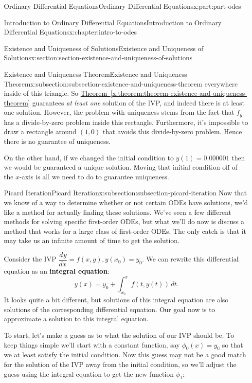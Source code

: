 \documentclass[oneside,10pt,]{book}
\newcommand{\xreffont}{\relax}
\newcommand{\terminology}[1]{\textbf{#1}}
\numberwithin{equation}{part}
\newcommand{\dv}[3][]{\dfrac{d^{#1} #2}{d #3^{#1}}}
\begin{document}
\begin{partptx}{Ordinary Differential Equations}{}{Ordinary Differential Equations}{}{}{x:part:part-odes}
\begin{chapterptx}{Introduction to Ordinary Differential Equations}{}{Introduction to Ordinary Differential Equations}{}{}{x:chapter:intro-to-odes}
\begin{sectionptx}{Existence and Uniqueness of Solutions}{}{Existence and Uniqueness of Solutions}{}{}{x:section:section-existence-and-uniqueness-of-solutions}
\begin{subsectionptx}{Existence and Uniqueness Theorem}{}{Existence and Uniqueness Theorem}{}{}{x:subsection:subsection-existence-and-uniqueness-theorem}
everywhere inside of this triangle. So \hyperref[x:theorem:theorem-existence-and-uniqueness-theorem]{Theorem~{\xreffont\ref{x:theorem:theorem-existence-and-uniqueness-theorem}}} guarantees \emph{at least one} solution of the IVP, and indeed there is at least one solution. However, the problem with uniqueness stems from the fact that \(f_{y}\) has a divide-by-zero problem inside this rectangle. Furthermore, it's impossible to draw a rectangle around \((1,0)\) that avoids this divide-by-zero problem. Hence there is no guarantee of uniqueness.%
\par
On the other hand, if we changed the initial condition to \(y(1) = 0.000001\) then we would be guaranteed a unique solution. Moving that initial condition off of the \(x\)-axis is all we need to do to guarantee uniqueness.%
\end{subsectionptx}
%
%
\typeout{************************************************}
\typeout{************************************************}
%
\begin{subsectionptx}{Picard Iteration}{}{Picard Iteration}{}{}{x:subsection:subsection-picard-iteration}
Now that we know of a way to determine whether or not certain ODEs have solutions, we'd like a method for actually finding these solutions. We've seen a few different methods for solving specific first-order ODEs, but what we'll do now is discuss a method that works for a large class of first-order ODEs. The only catch is that it may take us an infinite amount of time to get the solution.%
\par
Consider the IVP \(\dv{y}{x} = f(x,y), y(x_{0}) = y_{0}\). We can rewrite this differential equation as an \terminology{integral equation}:%
\begin{equation*}
y(x) = y_{0} + \int_{x_{0}}^{x}f(t,y(t))\,dt.
\end{equation*}
It looks quite a bit different, but solutions of this integral equation are also solutions of the corresponding differential equation. Our goal now is to approximate a solution to this integral equation.%
\par
To start, let's make a guess as to what the solution of our IVP should be. To keep things simple we'll start with a constant function, say \(\phi_{0}(x) = y_{0}\) so that we at least satisfy the initial condition. Now this guess may not be a good match for the solution of the IVP away from the initial condition, so we'll adjust the guess using the integral equation to get the new function \(\phi_{1}\):%
\begin{equation*}

\end{equation*}
\end{subsectionptx}
\end{sectionptx}
\end{chapterptx}
\end{partptx}
\end{document}
